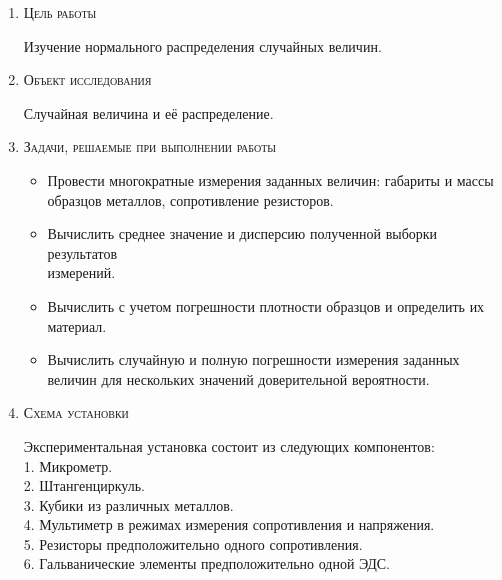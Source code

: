 \documentclass[12pt]{article}
\begin{document}
\begin{enumerate}
    \item \large\textsc{Цель работы}

    Изучение нормального распределения случайных величин.
     
    \item \large\textsc{Объект исследования}

    Случайная величина и её распределение.

    \item \large\textsc{Задачи, решаемые при выполнении работы}
      \begin{itemize}

       \item Провести многократные измерения заданных величин: габариты и массы образцов металлов, сопротивление резисторов.

       
       \item Вычислить среднее значение и дисперсию полученной выборки результатов \\измерений.

       \item Вычислить с учетом погрешности плотности образцов и определить их материал.


       \item Вычислить случайную и полную погрешности измерения заданных величин для нескольких значений доверительной вероятности.
        \\
      \end{itemize}
      \newpage
    \item \large\textsc{Схема установки}
      
          
       Экспериментальная установка состоит из следующих компонентов:\\
       
       1. Микрометр. \\
       2. Штангенциркуль. \\
       3. Кубики из различных металлов.\\
       4. Мультиметр в режимах измерения сопротивления и напряжения.\\
       5. Резисторы предположительно одного сопротивления.\\
       6. Гальванические элементы предположительно одной ЭДС.\\
       

\end{enumerate}
\end{document}
